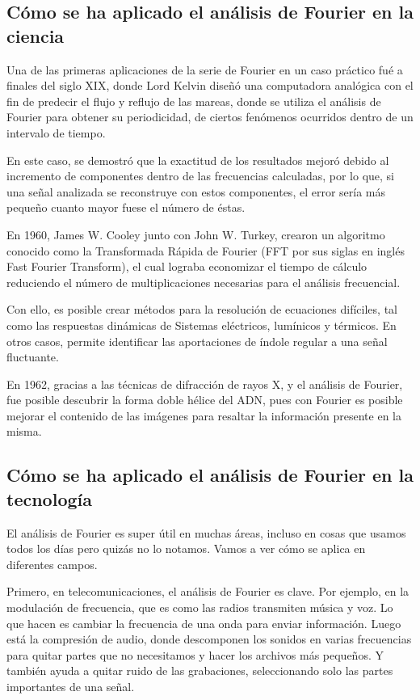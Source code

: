\subsection{Cómo se ha aplicado el análisis de Fourier en la ciencia}

Una de las primeras aplicaciones de la serie de Fourier en un caso práctico fué a finales del siglo XIX, donde Lord Kelvin diseñó una computadora analógica con el fin de predecir el flujo y reflujo de las mareas, donde se utiliza el análisis de Fourier para obtener su periodicidad, de ciertos fenómenos ocurridos dentro de un intervalo de tiempo.

En este caso, se demostró que la exactitud de los resultados mejoró debido al incremento de componentes dentro de las frecuencias calculadas, por lo que, si una señal analizada se reconstruye con estos componentes, el error sería más pequeño cuanto mayor fuese el número de éstas.

En 1960, James W. Cooley junto con John W. Turkey, crearon un algoritmo conocido como la Transformada Rápida de Fourier (FFT por sus siglas en inglés Fast Fourier Transform), el cual lograba economizar el tiempo de cálculo reduciendo el número de multiplicaciones necesarias para el análisis frecuencial.

Con ello, es posible crear métodos para la resolución de ecuaciones difíciles, tal como las respuestas dinámicas de Sistemas eléctricos, lumínicos y térmicos. En otros casos, permite identificar las aportaciones de índole regular a una señal fluctuante.

En 1962, gracias a las técnicas de difracción de rayos X, y el análisis de Fourier, fue posible descubrir la forma doble hélice del ADN, pues con Fourier es posible mejorar el contenido de las imágenes para resaltar la información presente en la misma.

\subsection{Cómo se ha aplicado el análisis de Fourier en la tecnología}

El análisis de Fourier es super útil en muchas áreas, incluso en cosas que usamos todos los días pero quizás no lo notamos. Vamos a ver cómo se aplica en diferentes campos.

Primero, en telecomunicaciones, el análisis de Fourier es clave. Por ejemplo, en la modulación de frecuencia, que es como las radios transmiten música y voz. Lo que hacen es cambiar la frecuencia de una onda para enviar información. Luego está la compresión de audio, donde descomponen los sonidos en varias frecuencias para quitar partes que no necesitamos y hacer los archivos más pequeños. Y también ayuda a quitar ruido de las grabaciones, seleccionando solo las partes importantes de una señal.

